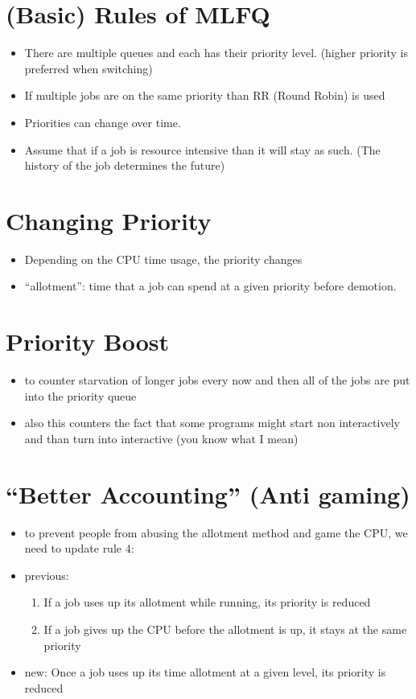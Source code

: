 \documentclass[11pt]{report}
\begin{document}
\section{(Basic) Rules of MLFQ}
\label{sec:orga3d0fb4}
\begin{itemize}
\item There are multiple queues and each has their priority level. (higher priority is preferred when switching)
\item If multiple jobs are on the same priority than RR (Round Robin) is used
\item Priorities can change over time.
\item Assume that if a job is resource intensive than it will stay as such. (The history of the job determines the future)
\end{itemize}
\section{Changing Priority}
\label{sec:org4946c2d}
\begin{itemize}
\item Depending on the CPU time usage, the priority changes
\item ``allotment'': time that a job can spend at a given priority before demotion.
\end{itemize}
\section{Priority Boost}
\label{sec:orgfe8a82e}
\begin{itemize}
\item to counter starvation of longer jobs every now and then all of the jobs are put into the priority queue
\item also this counters the fact that some programs might start non interactively and than turn into interactive (you know what I mean)
\end{itemize}
\section{``Better Accounting'' (Anti gaming)}
\label{sec:orgd12a267}
\begin{itemize}
\item to prevent people from abusing the allotment method and game the CPU, we need to update rule 4:
\item previous:
\begin{enumerate}
\item If a job uses up its allotment while running, its priority is reduced
\item If a job gives up the CPU before the allotment is up, it stays at the same priority
\end{enumerate}
\item new:
Once a job uses up its time allotment at a given level, its priority is reduced
\end{itemize}
\end{document}
